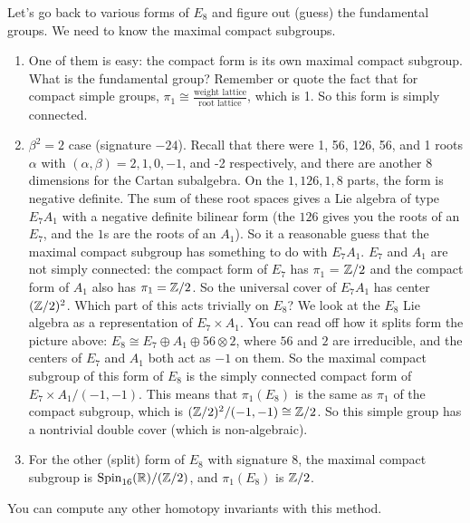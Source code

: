  \begin{example}
  Let's go back to various forms of $E_8$ and figure out (guess) the fundamental
  groups. We need to know the maximal compact subgroups.

  \begin{enumerate}
  \item One of them is easy: the
  compact form is its own maximal compact subgroup. What is the fundamental group?
  Remember or quote the fact that for compact simple groups, $\pi_1\cong \frac{\text{weight
  lattice}}{\text{root lattice}}$, which is 1. So this form is simply connected.

  \item $\beta^2=2$ case (signature $-24$).
  Recall that there were 1, 56, 126, 56, and 1 roots $\alpha$
  with $(\alpha,\beta)=2,1,0,-1$, and -2 respectively,
  and there are another $8$ dimensions for the Cartan subalgebra.
   On the $1,126,1,8$ parts, the form is negative definite. The sum of these root
   spaces gives a Lie algebra of type $E_7 A_1$ with a negative definite bilinear form
   (the $126$ gives you the roots of an $E_7$, and the $1$s are the roots of an
   $A_1$). So it a reasonable guess that the maximal compact subgroup has something to
   do with $E_7A_1$. $E_7$ and $A_1$ are not simply connected: the compact form of
   $E_7$ has $\pi_1$ = $\mathbb{Z}/2$ and the compact form of $A_1$ also has $\pi_1 = \mathbb{Z}/2$.
   So the universal cover of $E_7A_1$ has center $(\mathbb{Z}/2)^2$. Which part of this acts
   trivially on $E_8$? We look at the $E_8$ Lie algebra as a representation of
   $E_7\times A_1$. You can read off how it splits form the picture above: $E_8\cong
   E_7\oplus A_1 \oplus 56 \otimes 2$, where $56$ and $2$ are irreducible, and the
   centers of $E_7$ and $A_1$ both act as $-1$ on them. So the maximal compact
   subgroup of this form of $E_8$ is the simply connected compact form of $E_7\times
   A_1/(-1,-1)$. This means that $\pi_1(E_8)$ is the same as $\pi_1$ of the compact
   subgroup, which is $(\mathbb{Z}/2)^2/(-1,-1)\cong \mathbb{Z}/2$. So this simple group has a
   nontrivial double cover (which is non-algebraic).

   \item For the other (split) form of $E_8$ with signature 8, the maximal compact
   subgroup is $\operatorname{Spin}_{16}(\mathbb{R})/(\mathbb{Z}/2)$, and $\pi_1(E_8)$ is $\mathbb{Z}/2$.
  \end{enumerate}
 You can compute any other homotopy invariants with this method.
 \end{example}

